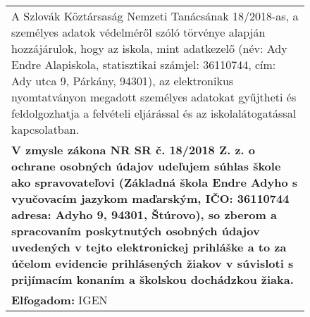 \documentclass[10pt,a4paper]{article}
\begin{document}
\begin{figure}[!ht]
\begin{tabular}{|m{\textwidth}|}
    \hline \vspace{3pt}
    A Szlovák Köztársaság Nemzeti Tanácsának 18/2018-as, a személyes adatok védelméről szóló törvénye alapján hozzájárulok, hogy az iskola, mint adatkezelő (név: Ady Endre Alapiskola, statisztikai számjel: 36110744, cím: Ady utca 9, Párkány, 94301), az elektronikus nyomtatványon megadott személyes adatokat gyűjtheti és feldolgozhatja a felvételi eljárással és az iskolalátogatással kapcsolatban.  \\
    \textbf{V zmysle zákona NR SR č. 18/2018 Z. z. o ochrane osobných údajov udeľujem súhlas škole ako spravovateľovi (Základná škola Endre Adyho s vyučovacím jazykom maďarským, IČO: 36110744 adresa: Adyho 9, 94301, Štúrovo), so zberom a spracovaním poskytnutých osobných údajov uvedených v tejto elektronickej prihláške a to za účelom evidencie prihlásených žiakov v súvisloti s prijímacím konaním a školskou dochádzkou žiaka.} \vspace{3pt} \\
    \hline \vspace{3pt}
    \textbf{Elfogadom:} \hspace{0.5cm} IGEN \vspace{3pt} \\
    \hline 
    \end{tabular} 
    \end{figure}
\end{document}
